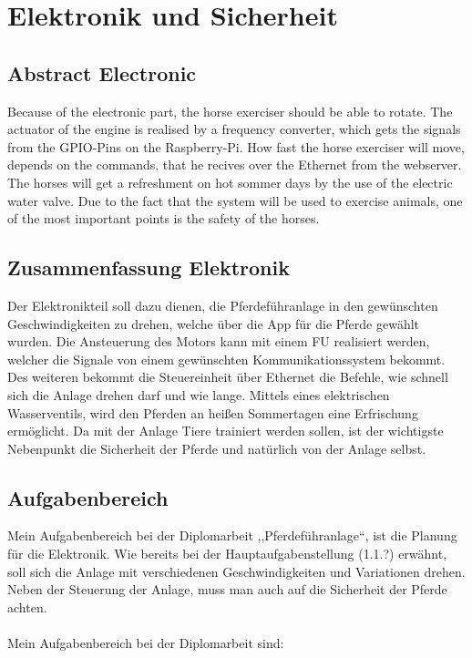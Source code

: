 \chapter{Elektronik und Sicherheit}
\label{sec:elektronikUndSicherheit}

\section{Abstract Electronic}
\label{sec:abstractETE}

Because of the electronic part, the horse exerciser should be able to rotate. \cite{test-buch}
The actuator of the engine is realised by a frequency converter, which gets the signals from the GPIO-Pins on the Raspberry-Pi.
How fast the horse exerciser will move, depends on the commands, that he recives over the Ethernet from the webserver.
The horses will get a refreshment on hot sommer days by the use of the electric water valve.
Due to the fact that the system will be used to exercise animals, one of the most important points is the safety of the horses.

\section{Zusammenfassung Elektronik}
\label{sec:zusammenfassungElektronik}

Der Elektronikteil soll dazu dienen, die Pferdeführanlage in den gewünschten Geschwindigkeiten zu drehen, welche über die App für die Pferde gewählt wurden. 
Die Ansteuerung des Motors kann mit einem \ac{FU} realisiert werden, 
welcher die Signale von einem gewünschten Kommunikationssystem bekommt.
Des weiteren bekommt die Steuereinheit über Ethernet die Befehle, wie schnell sich die Anlage drehen darf und wie lange. 
Mittels eines elektrischen Wasserventils, wird den Pferden an heißen Sommertagen eine Erfrischung ermöglicht. 
Da mit der Anlage Tiere trainiert werden sollen, ist der wichtigste Nebenpunkt die Sicherheit der Pferde und natürlich von der Anlage selbst.
\newpage

\section{Aufgabenbereich}
\label{sec:aufgabenbereich}

Mein Aufgabenbereich bei der Diplomarbeit ,,Pferdeführanlage“, ist die Planung für die Elektronik. Wie bereits bei der Hauptaufgabenstellung (1.1.?) erwähnt, 
soll sich die Anlage mit verschiedenen Geschwindigkeiten und Variationen drehen.  Neben der Steuerung der Anlage, muss man auch auf die Sicherheit der Pferde achten.
\\
\\
Mein Aufgabenbereich bei der Diplomarbeit sind:

